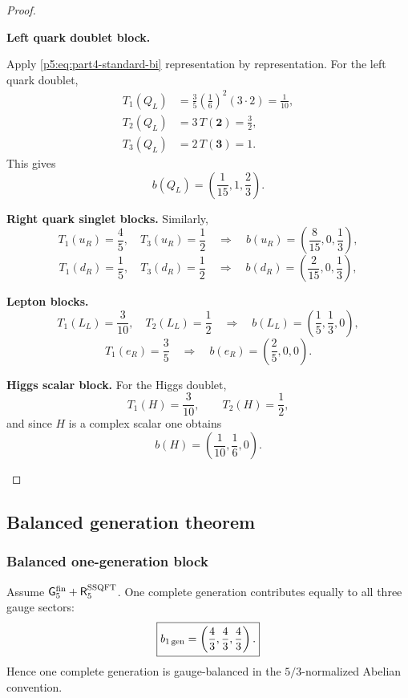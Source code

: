 \documentclass[11pt,a4paper]{article}
\begin{document}
\begin{proof}

\begin{proofsteps}
\item \textbf{Left quark doublet block.}
\leavevmode\par\noindent
Apply \eqref{p5:eq:part4-standard-bi} representation by representation.  For
the left quark doublet,
\[
\begin{aligned}
T_1(Q_L)
&=
\frac35\left(\frac16\right)^2(3\cdot 2)
=
\frac{1}{10},
\\
T_2(Q_L)
&=
3\,T(\mathbf 2)
=
\frac32,
\\
T_3(Q_L)
&=
2\,T(\mathbf 3)
=
1.
\end{aligned}
\]
This gives
\[
b(Q_L)=\left(\frac{1}{15},1,\frac23\right).
\]

\item \textbf{Right quark singlet blocks.}
Similarly,
\[
T_1(u_R)=\frac45,\quad T_3(u_R)=\frac12\quad\Longrightarrow\quad b(u_R)=\left(\frac{8}{15},0,\frac13\right),
\]
\[
T_1(d_R)=\frac15,\quad T_3(d_R)=\frac12\quad\Longrightarrow\quad b(d_R)=\left(\frac{2}{15},0,\frac13\right),
\]

\item \textbf{Lepton blocks.}
\[
T_1(L_L)=\frac{3}{10},\quad T_2(L_L)=\frac12\quad\Longrightarrow\quad b(L_L)=\left(\frac15,\frac13,0\right),
\]
\[
T_1(e_R)=\frac35\quad\Longrightarrow\quad b(e_R)=\left(\frac25,0,0\right).
\]

\item \textbf{Higgs scalar block.}
For the Higgs doublet,
\[
T_1(H)=\frac{3}{10},\qquad T_2(H)=\frac12,
\]
and since $H$ is a complex scalar one obtains
\[
b(H)=\left(\frac{1}{10},\frac16,0\right).
\]
\end{proofsteps}
\end{proof}

\subsection{Balanced generation theorem}
\label{p5:sec:part4-balanced-generation}

\subsubsection{Balanced one-generation block}
\begin{theorem}
\label{p5:prop:part4-balanced-generation}
\label{p5:thm:part4-balanced-generation}%
Assume
\(\mathsf G_5^{\rm fin}
+\mathsf R_5^{\rm SSQFT}\).  One complete generation contributes equally to all
three gauge sectors:
\begin{equation}
\label{p5:eq:part4-balanced-generation}
\boxed{b_{\rm 1\,gen}=\left(\frac43,\frac43,\frac43\right).}
\end{equation}
Hence one complete generation is gauge-balanced in the \(5/3\)-normalized
Abelian convention.
\end{theorem}
\end{document}
